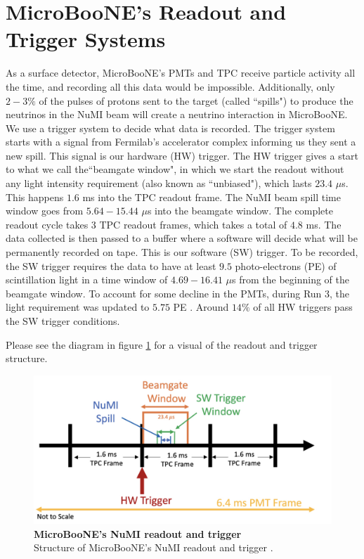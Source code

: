 \section{MicroBooNE's Readout and Trigger Systems}
  
As a surface detector, MicroBooNE's PMTs and TPC receive particle activity all the time, and recording all this data would be impossible. Additionally, only $2-3\%$ of the pulses of protons sent to the target (called ``spills") to produce the neutrinos in the NuMI beam will create a neutrino interaction in MicroBooNE. We use a trigger system to decide what data is recorded.
The trigger system starts with a signal from Fermilab's accelerator complex informing us they sent a new spill. This signal is our hardware (HW) trigger. The HW trigger gives a start to what we call the``beamgate window", in which we start the readout without any light intensity requirement (also known as ``unbiased"), which lasts $23.4$ $\mu $s. This happens $1.6$ ms into the TPC readout frame. The NuMI beam spill time window goes from $5.64- 15.44$ $\mu$s into the beamgate window. The complete readout cycle takes 3 TPC readout frames, which takes a total of $4.8$ ms.
The data collected is then passed to a buffer where a software will decide what will be permanently recorded on tape. This is our software (SW) trigger. To be recorded, the SW trigger requires the data to have at least $9.5$ photo-electrons (PE) of scintillation light in a time window of $4.69- 16.41$ $\mu$s from the beginning of the beamgate window. To account for some decline in the PMTs, during Run 3, the light requirement was updated to $5.75$ PE \cite{numi_redmine}. 
Around $14\%$ of all HW triggers pass the SW trigger conditions. 

Please see the diagram in figure \ref{trig} for a visual of the readout and trigger structure.

\begin{figure}[h!]
    \centering
    \includegraphics[width=150mm]{Figures/numi_trigger.jpg}
    \caption[MicroBooNE's NuMI readout and trigger]{\textbf{MicroBooNE's NuMI readout and trigger}\\Structure of MicroBooNE's NuMI readout and trigger \cite{krish_phd}.}
    \label{trig}
\end{figure}

